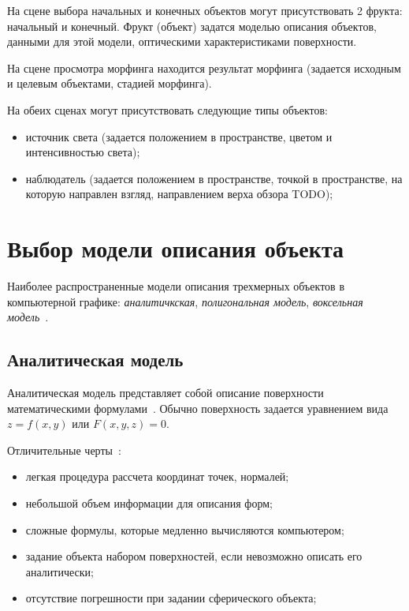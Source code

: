     На сцене выбора начальных и конечных объектов могут присутствовать 2 фрукта: начальный и конечный. Фрукт (объект) задатся моделью описания объектов, данными для этой модели, оптическими характеристиками поверхности.
    
    На сцене просмотра морфинга находится результат морфинга (задается исходным и целевым объектами, стадией морфинга). 
    
    На обеих сценах могут присутствовать следующие типы объектов:
    \begin{itemize}
    	\item источник света (задается положением в пространстве, цветом и интенсивностью света);
    	\item наблюдатель (задается положением в пространстве, точкой в пространстве, на которую направлен взгляд, направлением верха обзора TODO);
    \end{itemize}
    
    \section{Выбор модели описания объекта}
    Наиболее распространенные модели описания трехмерных объектов в компьютерной графике: \textit{аналитичкская}, \textit{полигональная модель}, \textit{воксельная модель}~\cite{porev}.
    
    \subsection{Аналитическая модель}
    Аналитическая модель представляет собой описание поверхности математическими формулами~\cite{porev}. Обычно поверхность задается уравнением вида $z=f(x,y)$ или $F(x,y,z)=0$.
    
    Отличительные черты~\cite{porev}:
    \begin{itemize}
    	\item легкая процедура рассчета координат точек, нормалей;
    	\item небольшой объем информации для описания форм;
    	\item сложные формулы, которые медленно вычисляются компьютером;
    	
    	\item задание объекта набором поверхностей, если невозможно описать его аналитически;
    	\item отсутствие погрешности при задании сферического объекта; 
    \end{itemize}
    
